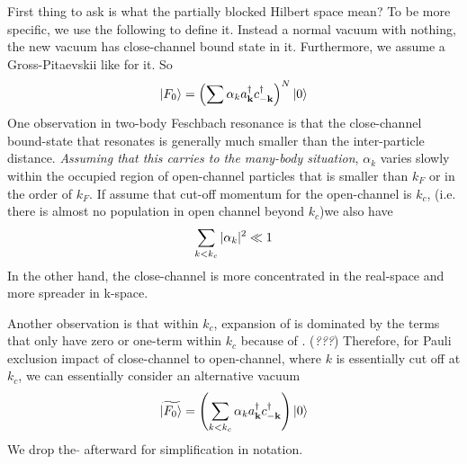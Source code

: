  First thing to ask is what the partially blocked Hilbert space mean?  To be more specific, we use the following to define it.  Instead a normal vacuum with nothing, the new vacuum has close-channel bound state in it.  Furthermore, we assume a Gross-Pitaevskii like for it.  So 
 \begin{equation}\label{eq:100908:F0N}
\left|F_{0}\right>=\left(\sum{\alpha_{k}a^{\ensuremath{\dagger}}_{\ensuremath{\mathbf{k}}}c^{\ensuremath{\dagger}}_{-\ensuremath{\mathbf{k}}}}\right)^{N}\left|0\right>	
\end{equation}
One observation in two-body Feschbach resonance is that the close-channel bound-state that resonates is generally much smaller than the inter-particle distance.  \emph{Assuming that this carries to the many-body situation},  $\alpha_{k}$ varies slowly within the occupied region of open-channel particles  that is smaller than $k_{F}$ or in the order of $k_{F}$.  If assume that cut-off momentum for the open-channel is $k_{c}$, (i.e. there is almost no population in open channel beyond $k_{c}$)we also have 
\begin{equation}\label{eq:100908:sumkc}
\sum_{k<k_{c}}{\lvert{\alpha_{k}}\rvert^{2}}\ll1
\end{equation}
In the other hand, the close-channel is more concentrated in the real-space and more spreader in k-space.  

Another observation is that within $k_{c}$, expansion of  is dominated by the terms that only have zero or one-term within $k_{c}$ because of . (\emph{???})  Therefore, for Pauli exclusion impact of close-channel to open-channel, where $k$ is essentially cut off at $k_{c}$,  we can essentially consider an alternative vacuum 
 \begin{equation}\label{eq:100908:vacuum2}
\widetilde{\left|F_{0}\right>}=\left(\sum_{k<k_{c}}{\alpha_{k}a^{\dagger}_{\mathbf{k}}c^{\dagger}_{-\mathbf{k}}}\right)\left|0\right>	
\end{equation}
We drop the $\widetilde{ }$ afterward for simplification in notation.  

